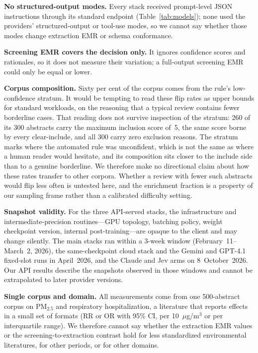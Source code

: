 \documentclass[preprint,review,12pt,authoryear]{elsarticle}
\begin{document}
\textbf{No structured-output modes.}
Every stack received prompt-level JSON instructions through its standard endpoint (Table~\ref{tab:models}); none used the providers' structured-output or tool-use modes, so we cannot say whether those modes change extraction EMR or schema conformance.

\textbf{Screening EMR covers the decision only.}
It ignores confidence scores and rationales, so it does not measure their variation; a full-output screening EMR could only be equal or lower.

\textbf{Corpus composition.}
Sixty per cent of the corpus comes from the rule's low-confidence stratum.
It would be tempting to read these flip rates as upper bounds for standard workloads, on the reasoning that a typical review contains fewer borderline cases. That reading does not survive inspection of the stratum: 260 of its 300 abstracts carry the maximum inclusion score of~5, the same score borne by every clear-include, and all 300 carry zero exclusion reasons. The stratum marks where the automated rule was unconfident, which is not the same as where a human reader would hesitate, and its composition sits closer to the include side than to a genuine borderline.
We therefore make no directional claim about how these rates transfer to other corpora. Whether a review with fewer such abstracts would flip less often is untested here, and the enrichment fraction is a property of our sampling frame rather than a calibrated difficulty setting.

\textbf{Snapshot validity.}
For the three API-served stacks, the infrastructure and intermediate-precision routines---GPU topology, batching policy, weight checkpoint version, internal post-training---are opaque to the client and may change silently. The main stacks ran within a 3-week window (February~11--March~2, 2026), the same-checkpoint cloud stack and the Gemini and GPT-4.1 fixed-slot runs in April~2026, and the Claude and Jev arms on 8~October~2026. Our API results describe the snapshots observed in those windows and cannot be extrapolated to later provider versions.

\textbf{Single corpus and domain.}
All measurements come from one 500-abstract corpus on PM$_{2.5}$ and respiratory hospitalization, a literature that reports effects in a small set of formats (RR or OR with 95\% CI, per 10~$\mu$g/m$^3$ or per interquartile range). We therefore cannot say whether the extraction EMR values or the screening-to-extraction contrast hold for less standardized environmental literatures, for other periods, or for other domains.
\end{document}
